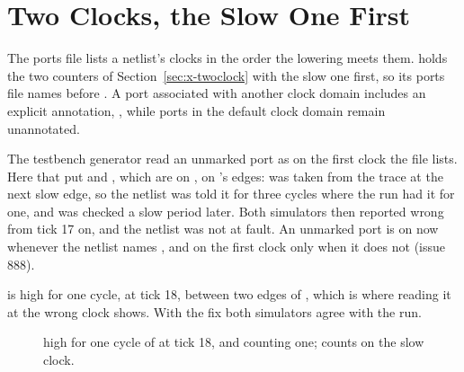 \section{Two Clocks, the Slow One First}
\label{sec:x-slowfirst}

The ports file lists a netlist's clocks in the order the lowering meets
them.  holds the two counters of
Section~\ref{sec:x-twoclock} with the slow one first, so its ports file
names  before . A port associated with another
clock domain includes an explicit annotation, , while
ports in the default clock domain remain unannotated.

The testbench generator read an unmarked port as on the first clock the
file lists. Here that put  and , which are on
, on 's edges:  was taken from the trace
at the next slow edge, so the netlist was told it for three cycles
where the run had it for one, and  was checked a slow period
later. Both simulators then reported  wrong from tick 17 on,
and the netlist was not at fault. An unmarked port is on 
now whenever the netlist names , and on the first clock only
when it does not (issue 888).

 is high for one cycle, at tick 18, between two edges of
, which is where reading it at the wrong clock shows. With
the fix both simulators agree with the run.

\begin{figure}[htbp]
\centering

\caption{ high for one cycle of  at tick 18, and
 counting one;  counts on the slow clock.}
\label{fig:x-slowfirst}
\end{figure}




